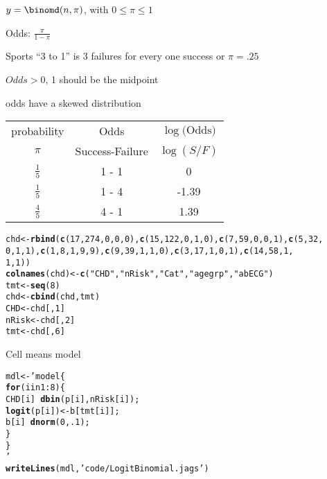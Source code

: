 \documentclass[12pt,letterpaper,oneside]{article}\usepackage{graphicx, color}
\makeatletter
\newcommand{\hlfunctioncall}[1]{\textcolor[rgb]{0.501960784313725,0,0.329411764705882}{\textbf{#1}}}%
\newcommand{\hlstring}[1]{\textcolor[rgb]{0.6,0.6,1}{#1}}%
\newenvironment{kframe}{%
 \def\at@end@of@kframe{}%
 \ifinner\ifhmode%
  \def\at@end@of@kframe{\end{minipage}}%
  \begin{minipage}{\columnwidth}%
 \fi\fi%
 \def\FrameCommand##1{\hskip\@totalleftmargin \hskip-\fboxsep
 \colorbox{shadecolor}{##1}\hskip-\fboxsep
     \hskip-\linewidth \hskip-\@totalleftmargin \hskip\columnwidth}%
 \MakeFramed {\advance\hsize-\width
   \@totalleftmargin\z@ \linewidth\hsize
   \@setminipage}}%
 {\par\unskip\endMakeFramed%
 \at@end@of@kframe}
\newenvironment{knitrout}{}{} %
\makeatother
\begin{document}
$y=\binomd(n,\pi)$, with $0 \le \pi \le 1$

Odds: $\frac{\pi}{1-\pi}$

Sports ``3 to 1'' is 3 failures for every one success or $\pi=.25$

$Odds > 0$, 1 should be the midpoint

odds have a skewed distribution

\begin{tabular}{c|c|c}
 \hline
 probability & Odds & $\log(\text{Odds)}$\\
 $\pi$ & Success-Failure & $\log(S/F)$\\
 \hline
 $\frac{1}{5}$ & 1 - 1 & 0\\
 $\frac{1}{5}$ & 1 - 4 & -1.39\\
 $\frac{4}{5}$ & 4 - 1 & 1.39\\
 \hline
\end{tabular}

\begin{knitrout}\scriptsize
{}\color{fgcolor}\begin{kframe}
\begin{alltt}
chd <- \hlfunctioncall{rbind}(\hlfunctioncall{c}(17, 274, 0, 0, 0), \hlfunctioncall{c}(15, 122, 0, 1, 0), \hlfunctioncall{c}(7, 59, 0, 0, 1), \hlfunctioncall{c}(5, 32, 
    0, 1, 1), \hlfunctioncall{c}(1, 8, 1, 9, 9), \hlfunctioncall{c}(9, 39, 1, 1, 0), \hlfunctioncall{c}(3, 17, 1, 0, 1), \hlfunctioncall{c}(14, 58, 1, 
    1, 1))
\hlfunctioncall{colnames}(chd) <- \hlfunctioncall{c}(\hlstring{"CHD"}, \hlstring{"nRisk"}, \hlstring{"Cat"}, \hlstring{"agegrp"}, \hlstring{"abECG"})
tmt <- \hlfunctioncall{seq}(8)
chd <- \hlfunctioncall{cbind}(chd, tmt)
CHD <- chd[, 1]
nRisk <- chd[, 2]
tmt <- chd[, 6]
\end{alltt}
\end{kframe}
\end{knitrout}


Cell means model
\begin{knitrout}\scriptsize
{}\color{fgcolor}\begin{kframe}
\begin{alltt}
mdl <- ' model \{
    \hlfunctioncall{for} (i in 1:8) \{
        CHD[i] ~ \hlfunctioncall{dbin}(p[i], nRisk[i]);
            \hlfunctioncall{logit}(p[i]) <- b[tmt[i]];
            b[i] ~ \hlfunctioncall{dnorm}(0, .1);
    \}
\}
'
\hlfunctioncall{writeLines}(mdl,\hlstring{'code/LogitBinomial.jags'})
\end{alltt}
\end{kframe}
\end{knitrout}
\end{document}
